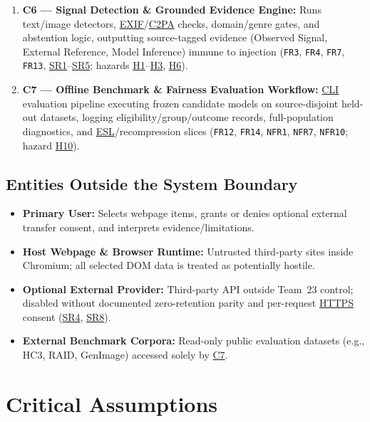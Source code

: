 \documentclass[11pt]{article}
\newcommand{\CLI}{\hyperlink{ha-acr-cli}{CLI}}
\newcommand{\CTwoPA}{\hyperlink{ha-acr-c2pa}{C2PA}}
\newcommand{\ESL}{\hyperlink{ha-acr-esl}{ESL}}
\newcommand{\EXIF}{\hyperlink{ha-acr-exif}{EXIF}}
\newcommand{\HTTPS}{\hyperlink{ha-acr-https}{HTTPS}}
\begin{document}
\begin{enumerate}[leftmargin=*]
    \item {}\label{comp:C6}\textbf{C6 --- Signal Detection \& Grounded Evidence Engine:} Runs text/image detectors, \EXIF{}/\CTwoPA{} checks, domain/genre gates, and abstention logic, outputting source-tagged evidence (Observed Signal, External Reference, Model Inference) immune to injection (\texttt{FR3}, \texttt{FR4}, \texttt{FR7}, \texttt{FR13}, \hyperref[SR1]{SR1}--\hyperref[SR5]{SR5}; hazards \hyperref[haz:H1]{H1}--\hyperref[haz:H3]{H3}, \hyperref[haz:H6]{H6}).
    \item {}\label{comp:C7}\textbf{C7 --- Offline Benchmark \& Fairness Evaluation Workflow:} \CLI{} evaluation pipeline executing frozen candidate models on source-disjoint held-out datasets, logging eligibility/group/outcome records, full-population diagnostics, and \ESL{}/recompression slices (\texttt{FR12}, \texttt{FR14}, \texttt{NFR1}, \texttt{NFR7}, \texttt{NFR10}; hazard \hyperref[haz:H10]{H10}).
\end{enumerate}

\subsection{Entities Outside the System Boundary}
\begin{itemize}[leftmargin=*]
    \item \textbf{Primary User:} Selects webpage items, grants or denies optional external transfer consent, and interprets evidence/limitations.
    \item \textbf{Host Webpage \& Browser Runtime:} Untrusted third-party sites inside Chromium; all selected DOM data is treated as potentially hostile.
    \item \textbf{Optional External Provider:} Third-party API outside Team~23 control; disabled without documented zero-retention parity and per-request \HTTPS{} consent (\hyperref[SR4]{SR4}, \hyperref[SR8]{SR8}).
    \item \textbf{External Benchmark Corpora:} Read-only public evaluation datasets (e.g., HC3, RAID, GenImage) accessed solely by \hyperref[comp:C7]{C7}.
\end{itemize}

\section{Critical Assumptions}\label{sec:assumptions}
\end{document}
